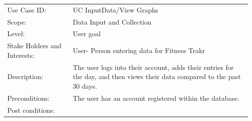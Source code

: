 \documentclass[10pt]{article}
\begin{document}
\begin{longtable}[]{@{}ll@{}}
\toprule
\begin{minipage}[t]{0.47\columnwidth}\raggedright\strut
Use Case ID:\strut
\end{minipage} & \begin{minipage}[t]{0.47\columnwidth}\raggedright\strut
UC InputData/View Graphs\strut
\end{minipage}\tabularnewline
\begin{minipage}[t]{0.47\columnwidth}\raggedright\strut
Scope:\strut
\end{minipage} & \begin{minipage}[t]{0.47\columnwidth}\raggedright\strut
Data Input and Collection\strut
\end{minipage}\tabularnewline
\begin{minipage}[t]{0.47\columnwidth}\raggedright\strut
Level:\strut
\end{minipage} & \begin{minipage}[t]{0.47\columnwidth}\raggedright\strut
User goal\strut
\end{minipage}\tabularnewline
\begin{minipage}[t]{0.47\columnwidth}\raggedright\strut
Stake Holders and Interests:\strut
\end{minipage} & \begin{minipage}[t]{0.47\columnwidth}\raggedright\strut
User- Person entering data for Fitness Trakr\strut
\end{minipage}\tabularnewline
\begin{minipage}[t]{0.47\columnwidth}\raggedright\strut
Description:\strut
\end{minipage} & \begin{minipage}[t]{0.47\columnwidth}\raggedright\strut
The user logs into their account, adds their entries for the day, and then views their data compared to the past 30 days.\strut
\end{minipage}\tabularnewline
\begin{minipage}[t]{0.47\columnwidth}\raggedright\strut
Preconditions:\strut
\end{minipage} & \begin{minipage}[t]{0.47\columnwidth}\raggedright\strut
The user has an account registered within the database.\strut
\end{minipage}\tabularnewline
\begin{minipage}[t]{0.47\columnwidth}\raggedright\strut
Post conditions:\strut
\end{minipage} & \begin{minipage}[t]{0.47\columnwidth}\raggedright\strut

\end{minipage}
\end{longtable}
\end{document}
